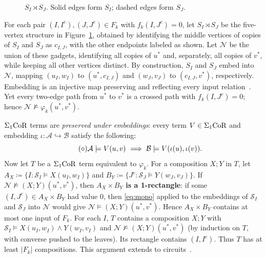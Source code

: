 \begin{figure}
  \centering
  \caption{\footnotesize $S_I\rtimes S_J$.
  Solid edges form $S_I$; dashed edges form $S_J$.}
  \label{fig:crossed-gadget}
\end{figure}
%
For each pair $(I,I^c),(J,J^c)\in F_k$ with $f_k(I,J^c)=0$,
let $S_I\rtimes S_J$ be the five-vertex structure in Figure~\ref{fig:crossed-gadget},
obtained by identifying the middle vertices of
copies of $S_I$ and $S_J$ as $c_{I,J}$,
with the other endpoints labeled as shown.
Let $\mathcal N$ be the union of these gadgets,
identifying all copies of $u^*$ and, separately,
all copies of $v^*$, while keeping all other
vertices distinct.
By construction, $S_I$ and $S_J$ embed into
$\mathcal N$, mapping $(u_I,w_I)$ to
$(u^*,c_{I,J})$ and $(w_J,v_J)$ to
$(c_{I,J},v^*)$, respectively.
Embedding is an injective map preserving and reflecting every input relation~\citep{hodges1993,marker2002}.
Yet every two-edge path from $u^*$ to $v^*$
is a crossed path with $f_k(I,J^c)=0$;
hence $\mathcal N\not\models\varphi_k(u^*,v^*)$.

$\Sigma_1\mathrm{CoR}$ terms are \emph{preserved under
embeddings}:
every term $V \in \Sigma_1\mathrm{CoR}$ and embedding
$\iota\colon\mathcal A\hookrightarrow\mathcal B$ satisfy the following:
\[
\tag{$\diamond$}\label{eq:mono}
\smash{\mathcal A\models V(u,v)\ \Longrightarrow\
\mathcal B\models V(\iota(u),\iota(v))}.
\]
Now let $T$ be a $\Sigma_1\mathrm{CoR}$ term equivalent to $\varphi_k$.
For a composition $X;Y$ in $T$, let
$A_X\coloneqq\{I:\mathcal S_I\models X(u_I,w_I)\}$ and
$B_Y\coloneqq\{J^c:\mathcal S_J\models Y(w_J,v_J)\}$.
If $\mathcal N\not\models(X;Y)(u^*,v^*)$, then \textbf{$A_X\times B_Y$ is a 1\nobreakdash-rectangle}:
if some $(I,J^c)\in A_X\times B_Y$ had value $0$, then \eqref{eq:mono} applied to
the embeddings of $\mathcal S_I$ and $\mathcal S_J$ into $\mathcal N$ would give
$\mathcal N\models(X;Y)(u^*,v^*)$.
Hence $A_X\times B_Y$ contains at most one input of $F_k$.
For each $I$, $T$ contains a composition $X;Y$ with
$\mathcal S_I\models X(u_I,w_I)\land Y(w_I,v_I)$ and
$\mathcal N\not\models(X;Y)(u^*,v^*)$ (by induction on $T$, with converse pushed to the leaves).
Its rectangle contains $(I,I^c)$.
Thus $T$ has at least $|F_k|$ compositions.
This argument extends to circuits~\citep[\S6.3]{nakamura2022}.

